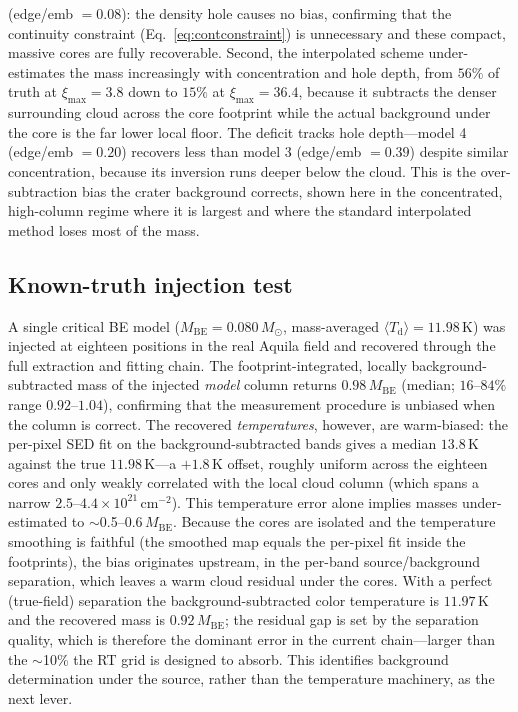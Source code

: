 \documentclass[11pt,a4paper]{article}
\newcommand{\msun}{M_{\odot}}
\newcommand{\ximax}{\xi_{\mathrm{max}}}
\begin{document}
(edge/emb $=0.08$): the density hole causes no bias, confirming that the
continuity constraint (Eq.~\ref{eq:contconstraint}) is unnecessary and these
compact, massive cores are fully recoverable. Second, the interpolated scheme
under-estimates the mass increasingly with concentration and hole depth, from
$56\%$ of truth at $\ximax=3.8$ down to $15\%$ at $\ximax=36.4$, because it
subtracts the denser surrounding cloud across the core footprint while the
actual background under the core is the far lower local floor. The deficit
tracks hole depth---model 4 (edge/emb $=0.20$) recovers less than model 3
(edge/emb $=0.39$) despite similar concentration, because its inversion runs
deeper below the cloud. This is the over-subtraction bias the crater
background corrects, shown here in the concentrated, high-column regime where
it is largest and where the standard interpolated method loses most of the
mass.

\subsection{Known-truth injection test}
\label{sec:injtest}

A single critical BE model ($M_{\mathrm{BE}}=0.080\,\msun$, mass-averaged
$\langle T_{\mathrm d}\rangle=11.98$\,K) was injected at eighteen positions
in the real Aquila field and recovered through the full extraction and
fitting chain. The footprint-integrated, locally background-subtracted mass
of the injected \emph{model} column returns $0.98\,M_{\mathrm{BE}}$ (median;
$16$--$84\%$ range $0.92$--$1.04$), confirming that the measurement procedure
is unbiased when the column is correct. The recovered \emph{temperatures},
however, are warm-biased: the per-pixel SED fit on the background-subtracted
bands gives a median $13.8$\,K against the true $11.98$\,K---a $+1.8$\,K
offset, roughly uniform across the eighteen cores and only weakly correlated
with the local cloud column (which spans a narrow $2.5$--$4.4\times10^{21}\,
\mathrm{cm^{-2}}$). This temperature error alone implies masses
under-estimated to $\sim$0.5--0.6\,$M_{\mathrm{BE}}$. Because the cores are
isolated and the temperature smoothing is faithful (the smoothed map equals
the per-pixel fit inside the footprints), the bias originates upstream, in
the per-band source/background separation, which leaves a warm cloud residual
under the cores. With a perfect (true-field) separation the
background-subtracted color temperature is $11.97$\,K and the recovered mass
is $0.92\,M_{\mathrm{BE}}$; the residual gap is set by the separation
quality, which is therefore the dominant error in the current chain---larger
than the $\sim$10\% the RT grid is designed to absorb. This identifies
background determination under the source, rather than the temperature
machinery, as the next lever.
\end{document}
